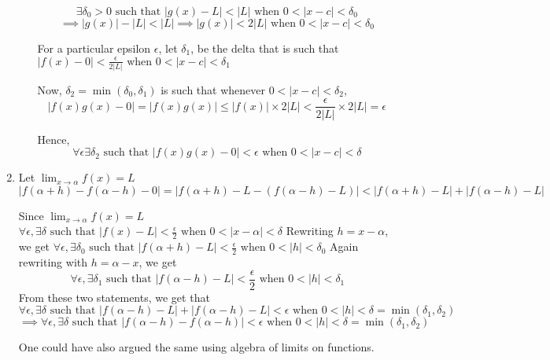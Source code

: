 \documentclass{article}
\begin{document}
\begin{enumerate}
\begin{enumerate}
                                 $$\exists \delta_0 > 0 \text{ such that } |g(x) - L| < |L|\text{ when } 0 < |x-c| < \delta_0$$
                                 $$\implies |g(x)| - |L| < |L| \implies |g(x)| < 2|L| \text{ when } 0 < |x-c| < \delta_0$$

                                 For a particular epsilon $\epsilon$, let $\delta_1$, be the delta that is such that 
                                 $|f(x) - 0 | < \frac{\epsilon}{2|L|} \text{ when } 0 < |x-c| < \delta_1$

                         Now, $\delta_2 = \min(\delta_0, \delta_1)$ is such that  whenever $0 < |x-c| < \delta_2$, 
                                 $$|f(x)g(x) - 0| = |f(x)g(x)| \leq |f(x)| \times 2|L| < \frac{\epsilon}{2|L|} \times 2|L| = \epsilon$$

                                 Hence,
                         $$\forall \epsilon \exists \delta_2  \text{ such that } |f(x)g(x) - 0| < \epsilon  \text{ when } 0 < |x-c| < \delta$$
                \end{enumerate}
        \item Let $\lim_{x\to \alpha}f(x) = L$
                $$|f(\alpha+h) - f(\alpha-h) - 0| = |f(\alpha+h) - L - (f(\alpha-h) - L)| < |f(\alpha+h)-L| + |f(\alpha-h) - L|$$

                Since $\lim_{x\to \alpha}f(x) = L$
                $\forall \epsilon, \exists \delta  \text{ such that } |f(x) - L| < \frac{\epsilon}{2}  \text{ when } 0 < |x-\alpha| < \delta $
                Rewriting $h = x-\alpha$, we get
                $\forall \epsilon, \exists \delta_0  \text{ such that } |f(\alpha + h) - L| < \frac{\epsilon}{2}  \text{ when } 0 < |h| < \delta_0 $
                Again rewriting with $h = \alpha-x$, we get 
                $$
                \forall \epsilon, \exists \delta_1  \text{ such that } |f(\alpha - h) - L| < \frac{\epsilon}{2}  \text{ when } 0 < |h| < \delta_1
                $$
                From these two statements, we get that
                $$\forall \epsilon, \exists \delta  \text{ such that } |f(\alpha-h) - L| + |f(\alpha - h) - L| < \epsilon  \text{ when } 0 < |h| < \delta = \min(\delta_1, \delta_2)$$
                $$
                \implies \forall \epsilon, \exists \delta  \text{ such that } |f(\alpha-h) - f(\alpha - h)|< \epsilon  \text{ when } 0 < |h| < \delta = \min(\delta_1, \delta_2)
                $$

                One could have also argued the same using algebra of limits on functions.


\end{enumerate}
\end{document}

